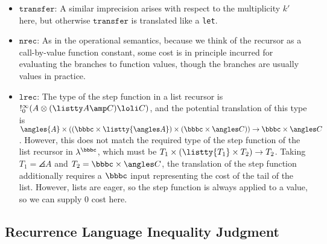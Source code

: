 \begin{itemize}
  \item $\texttt{transfer}$: A similar imprecision arises with respect
    to the multiplicity $k'$ here, but otherwise $\texttt{transfer}$ is
    translated like a \texttt{let}.  

% 
% 
  \item $\texttt{nrec}$: As in the operational semantics, because we
    think of the recursor as a call-by-value function constant, some
    cost is in principle incurred for evaluating the branches to
    function values, though the branches are usually values in practice.

  \item \sloppypar $\texttt{lrec}$: The type of the step function in a
    list recursor is $!^\infty_0(A \otimes (\listty A \amp C) \loli C)$,
    and the potential translation of this type is
    \mbox{$\angles{A} \times \left(\left(\bbbc \times \listty {\angles
      A}\right) \times \left(\bbbc \times \angles C\right)\right) \to
    \bbbc \times \angles C$}. However, this does not match the
    required type of the step function of the list recursor in
    $\lambda^\bbbc$, which must be $T_1 \times (\listty {T_1} \times
    T_2) \to T_2$.  Taking $T_1 = \angles{A}$ and $T_2 = \bbbc \times
    \angles C$, the translation of the step function additionally
    requires a $\bbbc$ input representing the cost of the tail of the
    list.  However, lists are eager, so the step function is always applied
    to a value, so we can supply $0$ cost here.
\end{itemize}


\subsection{Recurrence Language Inequality Judgment}\label{sec:so}

